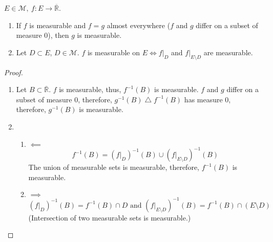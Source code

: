 \begin{observation}
    $E \in \mathcal{M},\ f : E \to \overline{\mathbb{R}}$.
    \begin{enumerate}
        \item {
            If $f$ is measurable and $f = g$ almost everywhere ($f$ and $g$ differ on a subset of measure 0), then $g$ is measurable.
        }
        \item {
            Let $D \subset E$, $D \in \mathcal{M}$. $f$ is measurable on $E \Longleftrightarrow f|_D$ and $f|_{E \setminus D}$ are measurable.
        }
    \end{enumerate}
\end{observation}
\begin{proof}
    \begin{enumerate}
        \item {
            Let $B \subset \overline{\mathbb{R}}$. $f$ is measurable, thus, $f^{-1}(B)$ is measurable.
            $f$ and $g$ differ on a subset of measure 0, therefore, $g^{-1}(B) \operatorname{\triangle} f^{-1}(B)$ has measure 0,
            therefore, $g^{-1}(B)$ is measurable.
        }
        \item {
            \begin{enumerate}
                \item {
                    $\impliedby$
                    \[
                        f^{-1}(B) = (f|_D)^{-1}(B) \cup (f|_{E \setminus D})^{-1}(B)
                    \]
                    The union of measurable sets is measurable, therefore, $f^{-1}(B)$ is measurable.
                }
                \item {
                    $\implies$
                    \[
                        (f|_D)^{-1}(B) = f^{-1}(B) \cap D \text{ and } (f|_{E \setminus D})^{-1}(B) = f^{-1}(B) \cap (E \setminus D)
                    \]
                    (Intersection of two measurable sets is measurable.)
                }
            \end{enumerate}
        }
    \end{enumerate}
\end{proof}

